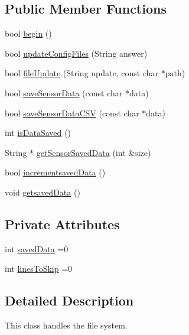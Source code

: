 \subsection*{Public Member Functions}
\begin{DoxyCompactItemize}
\item 
bool \hyperlink{class_cool_file_system_a6ba6f666ed4c530174f8569d2c636748}{begin} ()
\item 
bool \hyperlink{class_cool_file_system_adfa8e2e80641ae6f0cceabd348a9b841}{update\+Config\+Files} (String answer)
\item 
bool \hyperlink{class_cool_file_system_a13f2958f5b87757c31fc53797a30d23a}{file\+Update} (String update, const char $\ast$path)
\item 
bool \hyperlink{class_cool_file_system_afa3a4feae94871d4d3b6bebb701c2e67}{save\+Sensor\+Data} (const char $\ast$data)
\item 
bool \hyperlink{class_cool_file_system_ab78704d5d21ce10fc6f1138ab5ab46c8}{save\+Sensor\+Data\+C\+SV} (const char $\ast$data)
\item 
int \hyperlink{class_cool_file_system_ac86a40e7c3a1842f7342f698d34324f9}{is\+Data\+Saved} ()
\item 
String $\ast$ \hyperlink{class_cool_file_system_a3223ffff4266a6300988fab956d6b4b2}{get\+Sensor\+Saved\+Data} (int \&size)
\item 
bool \hyperlink{class_cool_file_system_aae045125288f255f3e258073dcada2a6}{incrementsaved\+Data} ()
\item 
void \hyperlink{class_cool_file_system_a70701d05e811604af1b531f4f6dc69ed}{getsaved\+Data} ()
\end{DoxyCompactItemize}
\subsection*{Private Attributes}
\begin{DoxyCompactItemize}
\item 
int \hyperlink{class_cool_file_system_ad9f5b739a32100f5f21270c3d9ee2b1d}{saved\+Data} =0
\item 
int \hyperlink{class_cool_file_system_a84fdb6057e534b395512463daa28ea3c}{lines\+To\+Skip} =0
\end{DoxyCompactItemize}


\subsection{Detailed Description}
This class handles the file system. 


